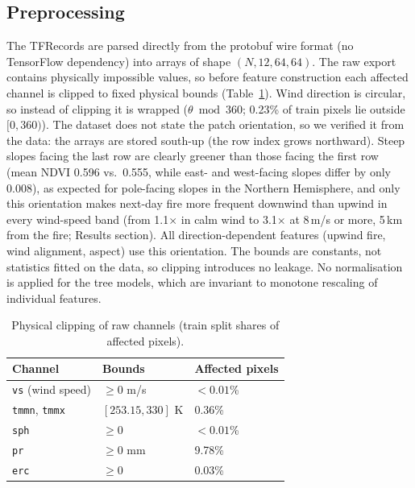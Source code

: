 \subsection{Preprocessing}
The TFRecords are parsed directly from the protobuf wire format (no TensorFlow dependency) into
arrays of shape $(N,12,64,64)$. The raw export contains physically impossible values,
so before feature construction each affected channel is clipped to fixed physical bounds
(Table~\ref{tab:clip}). Wind direction is circular, so instead of clipping it is wrapped
($\theta \bmod 360$; 0.23\% of train pixels lie outside $[0, 360)$).
The dataset does not state the patch orientation, so we verified it from the data: the arrays are
stored south-up (the row index grows northward). Steep slopes facing the last row are clearly
greener than those facing the first row (mean NDVI 0.596 vs.\ 0.555, while east- and west-facing
slopes differ by only 0.008), as expected for pole-facing slopes in the Northern Hemisphere, and only
this orientation makes next-day fire more frequent downwind than upwind in every wind-speed band
(from 1.1$\times$ in calm wind to 3.1$\times$ at 8\,m/s or more, 5\,km from the fire; Results section). All
direction-dependent features (upwind fire, wind alignment, aspect) use this orientation. The bounds are constants, not statistics fitted on the data, so clipping
introduces no leakage. No normalisation is applied for the tree models, which are invariant to
monotone rescaling of individual features.

\begin{table}[t]
\centering
\caption{Physical clipping of raw channels (train split shares of affected pixels).}
\label{tab:clip}
\begin{tabular}{lll}
\hline
Channel & Bounds & Affected pixels \\
\hline
\texttt{vs} (wind speed) & $\geq 0$ m/s & $<0.01$\% \\
\texttt{tmmn}, \texttt{tmmx} & $[253.15, 330]$ K & 0.36\% \\
\texttt{sph} & $\geq 0$ & $<0.01$\% \\
\texttt{pr} & $\geq 0$ mm & 9.78\% \\
\texttt{erc} & $\geq 0$ & 0.03\% \\
\hline
\end{tabular}
\end{table}

